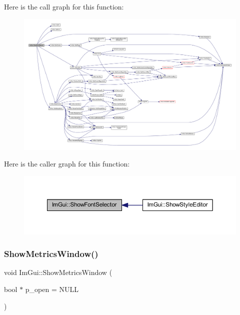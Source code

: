 Here is the call graph for this function\+:
\nopagebreak
\begin{figure}[H]
\begin{center}
\leavevmode
\includegraphics[width=350pt]{namespace_im_gui_a0bdce99eef17ef1e1fef40a18bd811ab_cgraph}
\end{center}
\end{figure}
Here is the caller graph for this function\+:
\nopagebreak
\begin{figure}[H]
\begin{center}
\leavevmode
\includegraphics[width=350pt]{namespace_im_gui_a0bdce99eef17ef1e1fef40a18bd811ab_icgraph}
\end{center}
\end{figure}
\mbox{\label{namespace_im_gui_afe7a28c6eb52fff3cc27d5a698fea4ff}} 
\subsubsection{\texorpdfstring{Show\+Metrics\+Window()}{ShowMetricsWindow()}}
{\footnotesize\ttfamily void Im\+Gui\+::\+Show\+Metrics\+Window (\begin{DoxyParamCaption}\item[{bool $\ast$}]{p\+\_\+open = {\ttfamily NULL} }\end{DoxyParamCaption})}

